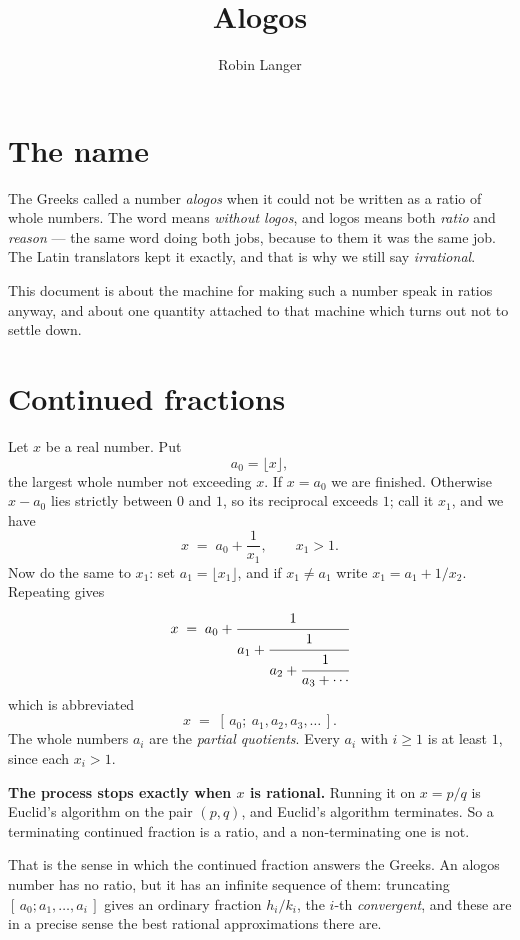 \documentclass[12pt,a4paper]{article}
\title{Alogos}
\author{Robin Langer}
\date{}
\begin{document}
\maketitle
\vspace{-1.5em}

\section{The name}

The Greeks called a number \emph{alogos} when it could not be written as a ratio of whole numbers. The word means \emph{without logos}, and logos means both \emph{ratio} and \emph{reason} --- the same word doing both jobs, because to them it was the same job. The Latin translators kept it exactly, and that is why we still say \emph{irrational}.

This document is about the machine for making such a number speak in ratios anyway, and about one quantity attached to that machine which turns out not to settle down.

\section{Continued fractions}

Let $x$ be a real number. Put
\[
  a_0 = \lfloor x \rfloor ,
\]
the largest whole number not exceeding $x$. If $x = a_0$ we are finished. Otherwise $x - a_0$ lies strictly between $0$ and $1$, so its reciprocal exceeds $1$; call it $x_1$, and we have
\[
  x \;=\; a_0 + \frac{1}{x_1}, \qquad x_1 > 1 .
\]
Now do the same to $x_1$: set $a_1 = \lfloor x_1 \rfloor$, and if $x_1 \neq a_1$ write $x_1 = a_1 + 1/x_2$. Repeating gives
\[
  x \;=\; a_0 + \cfrac{1}{a_1 + \cfrac{1}{a_2 + \cfrac{1}{a_3 + \cdots}}}
\]
which is abbreviated
\[
  x \;=\; [\,a_0;\ a_1, a_2, a_3, \ldots\,] .
\]
The whole numbers $a_i$ are the \emph{partial quotients}. Every $a_i$ with $i \geq 1$ is at least $1$, since each $x_i > 1$.

\textbf{The process stops exactly when $x$ is rational.} Running it on $x = p/q$ is Euclid's algorithm on the pair $(p,q)$, and Euclid's algorithm terminates. So a terminating continued fraction is a ratio, and a non-terminating one is not.

That is the sense in which the continued fraction answers the Greeks. An alogos number has no ratio, but it has an infinite sequence of them: truncating $[\,a_0; a_1, \ldots, a_i\,]$ gives an ordinary fraction $h_i/k_i$, the $i$-th \emph{convergent}, and these are in a precise sense the best rational approximations there are.
\end{document}
